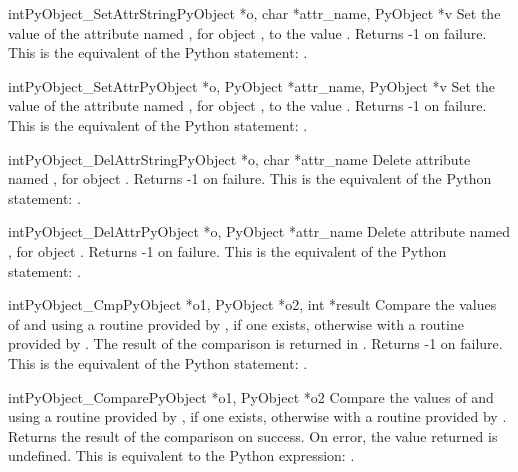      \begin{cfuncdesc}{int}{PyObject_SetAttrString}{PyObject *o, char *attr_name, PyObject *v}
	 Set the value of the attribute named , for object ,
	 to the value . Returns -1 on failure.  This is
	 the equivalent of the Python statement: .
     \end{cfuncdesc}


     \begin{cfuncdesc}{int}{PyObject_SetAttr}{PyObject *o, PyObject *attr_name, PyObject *v}
	 Set the value of the attribute named , for
	 object ,
	 to the value . Returns -1 on failure.  This is
	 the equivalent of the Python statement: .
     \end{cfuncdesc}


     \begin{cfuncdesc}{int}{PyObject_DelAttrString}{PyObject *o, char *attr_name}
	 Delete attribute named , for object . Returns -1 on
	 failure.  This is the equivalent of the Python
	 statement: .
     \end{cfuncdesc}


     \begin{cfuncdesc}{int}{PyObject_DelAttr}{PyObject *o, PyObject *attr_name}
	 Delete attribute named , for object . Returns -1 on
	 failure.  This is the equivalent of the Python
	 statement: .
     \end{cfuncdesc}


     \begin{cfuncdesc}{int}{PyObject_Cmp}{PyObject *o1, PyObject *o2, int *result}
	 Compare the values of  and  using a routine provided by
	 , if one exists, otherwise with a routine provided by .
	 The result of the comparison is returned in .  Returns
	 -1 on failure.  This is the equivalent of the Python
	 statement: .
     \end{cfuncdesc}


     \begin{cfuncdesc}{int}{PyObject_Compare}{PyObject *o1, PyObject *o2}
	 Compare the values of  and  using a routine provided by
	 , if one exists, otherwise with a routine provided by .
	 Returns the result of the comparison on success.  On error,
	 the value returned is undefined. This is equivalent to the
	 Python expression: .
     \end{cfuncdesc}


